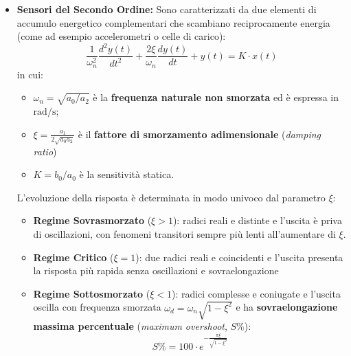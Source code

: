 ﻿\documentclass[11pt, a4paper]{article}
\begin{document}
\begin{itemize}
\begin{figure}[H]
\end{figure}
\newpage
\item \textbf{Sensori del Secondo Ordine:} Sono caratterizzati da due elementi di accumulo energetico complementari che scambiano reciprocamente energia (come ad esempio accelerometri o celle di carico):
\[
    \frac{1}{\omega_n^2} \frac{d^2 y(t)}{dt^2} + \frac{2\xi}{\omega_n} \frac{dy(t)}{dt} + y(t) = K \cdot x(t)
\]
in cui:
\begin{itemize}
    \item $\omega_n = \sqrt{a_0 / a_2}$ è la \textbf{frequenza naturale non smorzata} ed è espressa in $\si{\radian\per\second}$;
    \item $\xi = \frac{a_1}{2 \sqrt{a_0 a_2}}$ è il \textbf{fattore di smorzamento adimensionale} (\textit{damping ratio})
    \item $K = b_0 / a_0$ è la sensitività statica.
\end{itemize}

L'evoluzione della risposta è determinata in modo univoco dal parametro $\xi$:
\begin{itemize}
    \item \textbf{Regime Sovrasmorzato} ($\xi > 1$): radici reali e distinte e l'uscita è priva di oscillazioni, con fenomeni transitori sempre più lenti all'aumentare di $\xi$.
    \item \textbf{Regime Critico} ($\xi = 1$): due radici reali e coincidenti e l'uscita presenta la risposta più rapida senza oscillazioni e sovraelongazione
    \item \textbf{Regime Sottosmorzato} ($\xi < 1$): radici complesse e coniugate e l'uscita oscilla con frequenza smorzata $\omega_d = \omega_n \sqrt{1 - \xi^2}$ e ha \textbf{sovraelongazione massima percentuale} (\textit{maximum overshoot}, $S\%$):
    \[
        S\% = 100 \cdot e^{-\frac{\pi \xi}{\sqrt{1 - \xi^2}}}
    \]
\end{itemize}

\begin{figure}[H]
    \centering
\end{figure}
\end{itemize}
\end{document}

